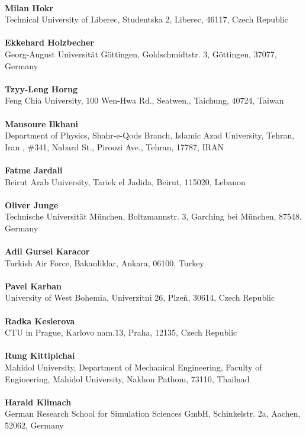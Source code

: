 \\ 
\textbf{Milan Hokr}
\\ 
Technical University of Liberec, Studentska 2, Liberec, 46117, Czech Republic\\ 
\\ 
\textbf{Ekkehard Holzbecher}
\\ 
Georg-August Universit\"at G\"ottingen, Goldschmidtstr. 3, G\"ottingen, 37077, Germany\\ 
\\ 
\textbf{Tzyy-Leng Horng}
\\ 
Feng Chia University, 100 Wen-Hwa Rd., Seatwen,, Taichung, 40724, Taiwan\\ 
\\ 
\textbf{Mansoure Ilkhani}
\\ 
Department of Physics, Shahr-e-Qods Branch, Islamic Azad University, Tehran, Iran , \#341, Nabard St., Piroozi Ave., Tehran, 17787, IRAN\\ 
\\ 
\textbf{Fatme Jardali}
\\ 
Beirut Arab University, Tariek el Jadida, Beirut, 115020, Lebanon\\ 
\\ 
\textbf{Oliver Junge}
\\ 
Technische Universit\"at M\"unchen, Boltzmannstr. 3, Garching bei M\"unchen, 87548, Germany\\ 
\\ 
\textbf{Adil Gursel Karacor}
\\ 
Turkish Air Force, Bakanliklar, Ankara, 06100, Turkey\\ 
\\ 
\textbf{Pavel Karban}
\\ 
University of West Bohemia, Univerzitni 26, Plze\v{n}, 30614, Czech Republic\\ 
\\ 
\textbf{Radka Keslerova}
\\ 
CTU in Prague, Karlovo nam.13, Praha, 12135, Czech Republic\\ 
\\ 
\textbf{Rung Kittipichai}
\\ 
Mahidol University, Department of Mechanical Engineering, Faculty of Engineering, Mahidol University, Nakhon Pathom, 73110, Thailnad\\ 
\\ 
\textbf{Harald Klimach}
\\ 
German Research School for Simulation Sciences GmbH, Schinkelstr. 2a, Aachen, 52062, Germany\\ 
